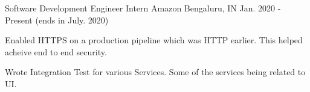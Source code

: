 


\begin{cventries}


\cventry
{Software Development Engineer Intern} %
{Amazon} %
{Bengaluru, IN} %
{Jan. 2020 - Present (ends in July. 2020)} %
{ %
\begin{cvitems}
\item {Enabled HTTPS on a production pipeline which was HTTP earlier. This helped acheive end to end security.}
\item {Wrote Integration Test for various Services. Some of the services being related to UI.}
\end{cvitems}
}


\end{cventries}